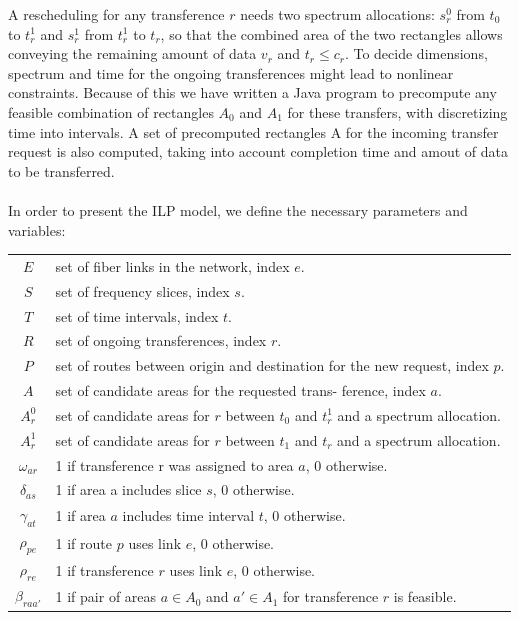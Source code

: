 \documentclass[11pt,a4paper]{article}
\begin{document}
A rescheduling for any transference $r$ needs two spectrum allocations: $s^{0}_{r}$ from $t_{0}$ to $t^{1}_{r}$ and $s^{1}_{r}$ from $t^{1}_{r}$ to $t_{r}$, so that the combined area of the two rectangles allows conveying the remaining amount of data $v_{r}$ and $t_{r} \leq  c_{r}$. To decide dimensions, spectrum and time for the ongoing transferences might lead to nonlinear constraints. Because of this we have written a Java program to precompute any feasible combination of rectangles $A_{0}$ and $A_{1}$ for these transfers, with discretizing time into intervals. A set of precomputed rectangles A for the incoming transfer request is also computed, taking into account completion time and amout of data to be transferred.\\\\
In order to present the ILP model, we define the necessary parameters and variables:
\begin{table}[H]
\small
\begin{tabular}{c l}
$E$ & set of fiber links in the network, index $e$.\\
$S$ &  set of frequency slices, index $s$.\\
$T$ & set of time intervals, index $t$.\\
$R$ & set of ongoing transferences, index $r$.\\
$P$ & set of routes between origin and destination for the new request, index $p$.\\
$A$ & set of candidate areas for the requested trans- ference, index $a$.\\
$A^{0}_{r}$ & set of candidate areas for $r$ between $t_{0}$ and $t^{1}_{r}$ and a spectrum allocation.\\
$A^{1}_{r}$ & set of candidate areas for $r$ between $t_{1}$ and $t_{r}$ and a spectrum allocation.\\
$\omega_{ar}$ & 1 if transference r was assigned to area $a$, 0 otherwise.\\
$\delta_{as}$ & 1 if area a includes slice $s$, 0 otherwise.\\
$\gamma_{at}$ & 1 if area $a$ includes time interval $t$, 0 otherwise.\\ 
$\rho_{pe}$ & 1 if route $p$ uses link $e$, 0 otherwise.\\
$\rho_{re}$ & 1 if transference $r$ uses link $e$, 0 otherwise.\\
$\beta_{raa'}$ & 1 if pair of areas $a \in A_{0}$ and $a' \in A_{1}$ for transference $r$ is feasible.\\
\end{tabular}
\end{table}
\end{document}
